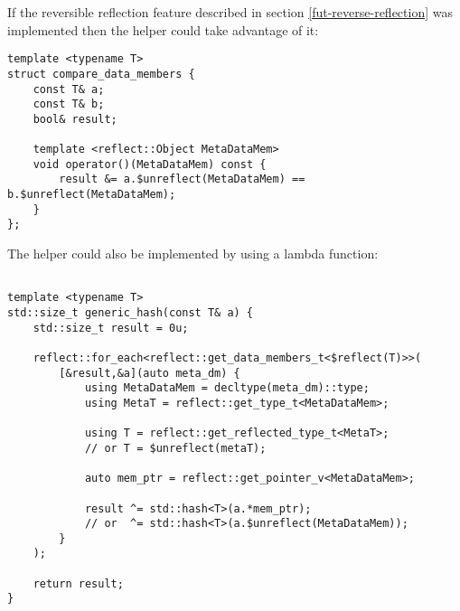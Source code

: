 If the reversible reflection feature described in section \ref{fut-reverse-reflection}
was implemented then the helper could take advantage of it:

\begin{verbatim}
template <typename T>
struct compare_data_members {
	const T& a;
	const T& b;
	bool& result;

	template <reflect::Object MetaDataMem>
	void operator()(MetaDataMem) const {
		result &= a.$unreflect(MetaDataMem) == b.$unreflect(MetaDataMem);
	}
};
\end{verbatim}

The helper could also be implemented by using a lambda function:

\begin{verbatim}

template <typename T>
std::size_t generic_hash(const T& a) {
	std::size_t result = 0u;

	reflect::for_each<reflect::get_data_members_t<$reflect(T)>>(
		[&result,&a](auto meta_dm) {
			using MetaDataMem = decltype(meta_dm)::type;
			using MetaT = reflect::get_type_t<MetaDataMem>;

			using T = reflect::get_reflected_type_t<MetaT>;
			// or T = $unreflect(metaT);

			auto mem_ptr = reflect::get_pointer_v<MetaDataMem>;

			result ^= std::hash<T>(a.*mem_ptr);
			// or  ^= std::hash<T>(a.$unreflect(MetaDataMem));
		}
	);

	return result;
}
\end{verbatim}

